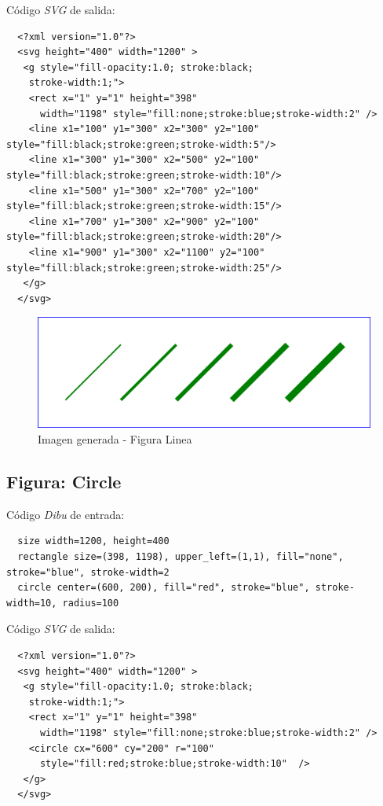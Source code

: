 Código \textit{SVG} de salida:

\begin{lstlisting}
  <?xml version="1.0"?>
  <svg height="400" width="1200" >
   <g style="fill-opacity:1.0; stroke:black;
    stroke-width:1;">
    <rect x="1" y="1" height="398"
      width="1198" style="fill:none;stroke:blue;stroke-width:2" />
    <line x1="100" y1="300" x2="300" y2="100" style="fill:black;stroke:green;stroke-width:5"/>
    <line x1="300" y1="300" x2="500" y2="100" style="fill:black;stroke:green;stroke-width:10"/>
    <line x1="500" y1="300" x2="700" y2="100" style="fill:black;stroke:green;stroke-width:15"/>
    <line x1="700" y1="300" x2="900" y2="100" style="fill:black;stroke:green;stroke-width:20"/>
    <line x1="900" y1="300" x2="1100" y2="100" style="fill:black;stroke:green;stroke-width:25"/>
   </g>
  </svg>
\end{lstlisting}


\begin{figure}[H]
\centering
\includegraphics[width=150mm]{imagenes/line.jpg}
\caption{Imagen generada - Figura Linea}
\end{figure}

\subsection{\textbf{Figura:} Circle}

Código \textit{Dibu} de entrada:

\begin{lstlisting}
  size width=1200, height=400
  rectangle size=(398, 1198), upper_left=(1,1), fill="none", stroke="blue", stroke-width=2
  circle center=(600, 200), fill="red", stroke="blue", stroke-width=10, radius=100
\end{lstlisting}

Código \textit{SVG} de salida:

\begin{lstlisting}
  <?xml version="1.0"?>
  <svg height="400" width="1200" >
   <g style="fill-opacity:1.0; stroke:black;
    stroke-width:1;">
    <rect x="1" y="1" height="398"
      width="1198" style="fill:none;stroke:blue;stroke-width:2" />
    <circle cx="600" cy="200" r="100"
      style="fill:red;stroke:blue;stroke-width:10"  />
   </g>
  </svg>
\end{lstlisting}

